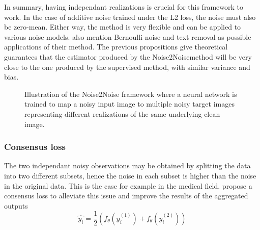 In summary, having independant realizations is crucial for this framework to work.
In the case of additive noise trained under the L2 loss, the noise must also be zero-mean.
Either way, the method is very flexible and can be applied to various noise models. \cite{lehtinen_noise2noise_2018} also mention Bernoulli noise and text removal as possible applications of their method.
The previous propositions give theoretical guarantees that the estimator produced by the Noise2Noisemethod will be very close to the one produced by the supervised method, with similar variance and bias.

\begin{figure}
    \centering
    \caption{Illustration of the Noise2Noise framework where a neural network is trained to map a noisy input image to multiple noisy target images representing different realizations of the same underlying clean image.}
    \label{fig:noise2noise}
\end{figure}

\subsubsection{Consensus loss}

The two independant noisy observations may be obtained by splitting the data into two
different subsets, hence the noise in each subset is higher than the noise in the original data.
This is the case for example in the medical field.
\cite{wu19} propose a consensus loss to alleviate this issue and improve the results of the aggregated outputs 
\begin{equation}
    \hat{y_i} = \frac{1}{2}(f_\theta(y_i^{(1)}) + f_\theta(y_i^{(2)}))
\end{equation}

